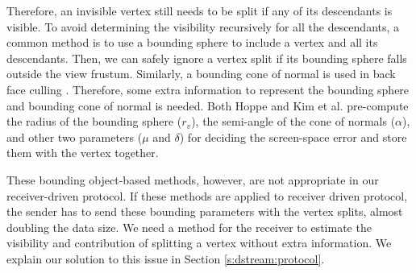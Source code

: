     Therefore, an invisible vertex still needs to be split if any of its descendants is visible. 
    To avoid determining the visibility %
    recursively for all the descendants,
    a common method is to use a bounding sphere to include a vertex and all its descendants.
    Then, we can safely ignore a vertex split if its bounding sphere
    falls outside the view frustum.
    Similarly, a bounding cone of normal is used in back face culling \cite{258843}.
    Therefore, some extra information to represent the bounding sphere
    and bounding cone of normal is needed. Both Hoppe and Kim et al. \cite{258843, kim:view}
    pre-compute the radius of the bounding sphere ($r_v$), the semi-angle of
    the cone of normals ($\alpha$), and other two parameters
    ($\mu$ and $\delta$) for deciding the screen-space error
    and store them with the vertex together.
    
    These bounding object-based methods, however, are not appropriate
    in our receiver-driven protocol. 
    If these methods are applied to receiver driven protocol, the sender has to send
    these bounding parameters with the vertex splits, almost doubling 
    the data size. 
    We need a method for the receiver to estimate the visibility and contribution of 
    splitting a vertex without extra information.
    We explain our solution to this issue in Section \ref{s:dstream:protocol}.


